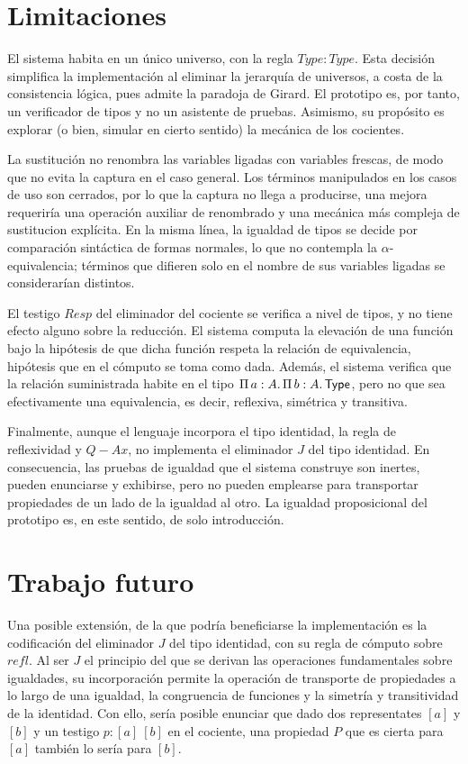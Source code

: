 \section{Limitaciones}
El sistema habita en un único universo, con la regla $Type : Type$. Esta decisión simplifica la implementación al eliminar la jerarquía de universos, a costa de la consistencia lógica, pues admite la paradoja de Girard. El prototipo es, por tanto, un verificador de tipos y no un asistente de pruebas. Asimismo, su propósito es explorar (o bien, simular en cierto sentido) la mecánica de los cocientes.

La sustitución no renombra las variables ligadas con variables frescas, de modo que no evita la captura en el caso general. Los términos manipulados en los casos de uso son cerrados, por lo que la captura no llega a producirse, una mejora requeriría una operación auxiliar de renombrado y una mecánica más compleja de sustitucion explícita. En la misma línea, la igualdad de tipos se decide por comparación sintáctica de formas normales, lo que no contempla la $\alpha$-equivalencia; términos que difieren solo en el nombre de sus variables ligadas se considerarían distintos.

El testigo $Resp$ del eliminador del cociente se verifica a nivel de tipos, y no tiene efecto alguno sobre la reducción. El sistema computa la elevación de una función bajo la hipótesis de que dicha función respeta la relación de equivalencia, hipótesis que en el cómputo se toma como dada. Además, el sistema verifica que la relación suministrada habite en el tipo $\Pi\, a : A.\, \Pi\, b : A.\, \mathsf{Type}$, pero no que sea efectivamente una equivalencia, es decir, reflexiva, simétrica y transitiva.

Finalmente, aunque el lenguaje incorpora el tipo identidad, la regla de reflexividad y $Q-Ax$, no implementa el eliminador $J$ del tipo identidad. En consecuencia, las pruebas de igualdad que el sistema construye son inertes, pueden enunciarse y exhibirse, pero no pueden emplearse para transportar propiedades de un lado de la igualdad al otro. La igualdad proposicional del prototipo es, en este sentido, de solo introducción.

\section{Trabajo futuro}

Una posible extensión, de la que podría beneficiarse la implementación es la codificación del eliminador $J$ del tipo identidad, con su regla de cómputo sobre $refl$. Al ser $J$ el principio del que se derivan las operaciones fundamentales sobre igualdades, su incorporación permite la operación de transporte de propiedades a lo largo de una igualdad, la congruencia de funciones y la simetría y transitividad de la identidad. Con ello, sería posible enunciar que dado dos representates $[a]$ y $[b]$ y un testigo $ p : [a] ~ [b]$ en el cociente, una propiedad $P$ que es cierta para $[a]$ también lo sería para $[b]$.

